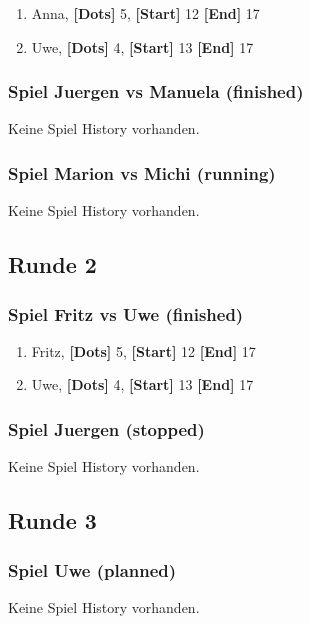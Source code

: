 \documentclass{article}
\begin{document}
  \begin{enumerate}

    \item Anna,
      \textbf{[Dots]} 5,
      \textbf{[Start]} 12
      \textbf{[End]} 17
    \item Uwe,
      \textbf{[Dots]} 4,
      \textbf{[Start]} 13
      \textbf{[End]} 17
  \end{enumerate}

    \subsubsection*{Spiel Juergen vs Manuela (finished)}

        Keine Spiel History vorhanden.

    \subsubsection*{Spiel Marion vs Michi (running)}

        Keine Spiel History vorhanden.

    \subsection{Runde 2}

    \subsubsection*{Spiel Fritz vs Uwe (finished)}

  \begin{enumerate}

    \item Fritz,
      \textbf{[Dots]} 5,
      \textbf{[Start]} 12
      \textbf{[End]} 17
    \item Uwe,
      \textbf{[Dots]} 4,
      \textbf{[Start]} 13
      \textbf{[End]} 17
  \end{enumerate}

    \subsubsection*{Spiel Juergen (stopped)}

        Keine Spiel History vorhanden.

    \subsection{Runde 3}

    \subsubsection*{Spiel Uwe (planned)}

        Keine Spiel History vorhanden.
\end{document}

